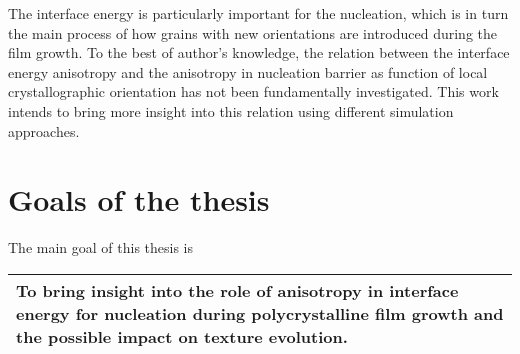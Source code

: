 The interface energy is particularly important for the nucleation, which is in turn the main process of how grains with new orientations are introduced during the film growth. To the best of author's knowledge, the relation between the interface energy anisotropy and the anisotropy in nucleation barrier as function of local crystallographic orientation has not been fundamentally investigated. This work intends to bring more insight into this relation using different simulation approaches.



\section{Goals of the thesis}
The main goal of this thesis is\\
\begin{tabular}{|p{\textwidth}|}
	\hline
	To bring insight into the role of anisotropy in interface energy for nucleation during polycrystalline film growth and the possible impact on texture evolution.\\
	\hline
\end{tabular}

